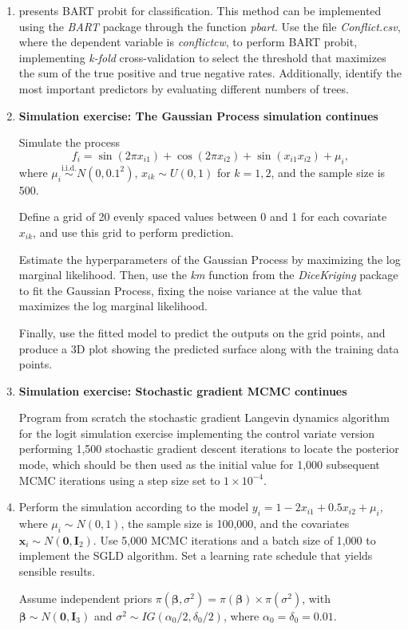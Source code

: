\begin{enumerate}
	\item \cite{chipman2010bart} presents BART probit for classification. This method can be implemented using the \textit{BART} package through the function \textit{pbart}. Use the file \textit{Conflict.csv}, where the dependent variable is \textit{conflictcw}, to perform BART probit, implementing \textit{k-fold} cross-validation to select the threshold that maximizes the sum of the true positive and true negative rates. Additionally, identify the most important predictors by evaluating different numbers of trees.
	
	
	\item \textbf{Simulation exercise: The Gaussian Process simulation continues}
	
	Simulate the process
	\[
	f_i = \sin(2\pi x_{i1}) + \cos(2\pi x_{i2}) + \sin(x_{i1} x_{i2}) + \mu_i,
	\]
	where \( \mu_i \overset{\text{i.i.d.}}{\sim} {N}(0, 0.1^2) \), \( x_{ik} \sim {U}(0,1) \) for \( k = 1, 2 \), and the sample size is 500. 
	
	Define a grid of 20 evenly spaced values between 0 and 1 for each covariate \( x_{ik} \), and use this grid to perform prediction.
	
	Estimate the hyperparameters of the Gaussian Process by maximizing the log marginal likelihood. Then, use the \textit{km} function from the \textit{DiceKriging} package to fit the Gaussian Process, fixing the noise variance at the value that maximizes the log marginal likelihood.
	
	Finally, use the fitted model to predict the outputs on the grid points, and produce a 3D plot showing the predicted surface along with the training data points.
	
	\item \textbf{Simulation exercise: Stochastic gradient MCMC continues} 
	
	Program from scratch the stochastic gradient Langevin dynamics algorithm for the logit simulation exercise implementing the control variate version performing 1{,}500 stochastic gradient descent iterations to locate the posterior mode, which should be then used as the initial value for 1{,}000 subsequent MCMC iterations using a step size set to \(1 \times 10^{-4}\).
	
	\item Perform the simulation according to the model \( y_i = 1 - 2 x_{i1} + 0.5 x_{i2} + \mu_i \), where \( \mu_i \sim {N}(0,1) \), the sample size is 100{,}000, and the covariates \( \mathbf{x}_i \sim {N}(\mathbf{0}, \mathbf{I}_2) \). Use 5{,}000 MCMC iterations and a batch size of 1{,}000 to implement the SGLD algorithm. Set a learning rate schedule that yields sensible results.
	
	Assume independent priors \( \pi(\boldsymbol{\beta}, \sigma^2) = \pi(\boldsymbol{\beta}) \times \pi(\sigma^2) \), with \( \boldsymbol{\beta} \sim {N}(\mathbf{0}, \mathbf{I}_3) \) and \( \sigma^2 \sim {IG}(\alpha_0/2, \delta_0/2) \), where \( \alpha_0 = \delta_0 = 0.01 \).
	
	
	  
\end{enumerate}

